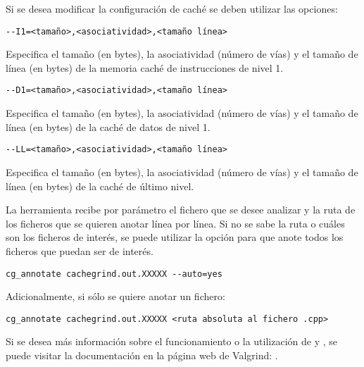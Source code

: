 Si se desea modificar la configuración de caché se deben utilizar las opciones:

\begin{lstlisting}[style=terminal,aboveskip=1em,belowskip=1em]
--I1=<tamaño>,<asociatividad>,<tamaño línea>
\end{lstlisting}

Especifica el tamaño (en bytes), la asociatividad (número de vías) y el tamaño
de línea (en bytes) de la memoria caché de instrucciones de nivel 1.

\begin{lstlisting}[style=terminal,aboveskip=1em,belowskip=1em]
--D1=<tamaño>,<asociatividad>,<tamaño línea>
\end{lstlisting}

Especifica el tamaño (en bytes), la asociatividad (número de vías) y el tamaño de
línea (en bytes) de la caché de datos de nivel 1.

\begin{lstlisting}[style=terminal,aboveskip=1em,belowskip=1em]
--LL=<tamaño>,<asociatividad>,<tamaño línea>
\end{lstlisting}

Especifica el tamaño (en bytes), la asociatividad (número de vías) y el tamaño de
línea (en bytes) de la caché de último nivel.

La herramienta  recibe por parámetro el fichero que se
desee analizar y la ruta de los ficheros que se quieren anotar línea por línea.
Si no se  sabe la ruta o cuáles son los ficheros de interés, se puede utilizar
la opción  para que anote todos los ficheros que puedan ser de
interés.

\begin{lstlisting}[style=terminal,aboveskip=1em,belowskip=1em]
cg_annotate cachegrind.out.XXXXX --auto=yes
\end{lstlisting}

\vspace{1em}

Adicionalmente, si sólo se quiere anotar un fichero: 

\begin{lstlisting}[style=terminal,aboveskip=1em,belowskip=1em]
cg_annotate cachegrind.out.XXXXX <ruta absoluta al fichero .cpp>
\end{lstlisting}

Si se desea más información sobre el funcionamiento o la utilización de
 y , se puede visitar la
documentación en la página web de Valgrind:
.
